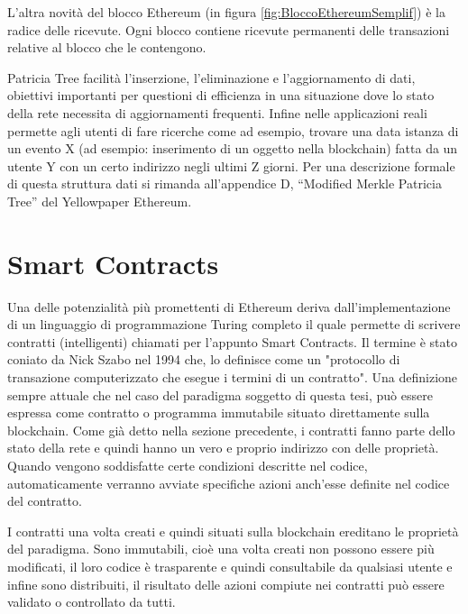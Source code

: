 L’altra novità del blocco Ethereum (in figura \ref{fig:BloccoEthereumSemplif}) è la radice delle ricevute. Ogni blocco contiene ricevute permanenti delle transazioni relative al blocco che le contengono.

Patricia Tree facilità l'inserzione, l'eliminazione e l'aggiornamento di dati, obiettivi importanti per questioni di efficienza in una situazione dove lo stato della rete necessita di aggiornamenti frequenti. Infine nelle applicazioni reali permette agli utenti di fare ricerche come ad esempio, trovare una data istanza di un evento X (ad esempio: inserimento di un oggetto nella blockchain) fatta da un utente Y con un certo indirizzo negli ultimi Z giorni.
Per una descrizione formale di questa struttura dati si rimanda all’appendice D, “Modified Merkle Patricia Tree” del Yellowpaper Ethereum.

\section{Smart Contracts}

Una delle potenzialità più promettenti di Ethereum deriva dall’implementazione di un linguaggio di programmazione Turing completo il quale permette di scrivere contratti (intelligenti) chiamati per l’appunto Smart Contracts. Il termine è stato coniato da Nick Szabo nel 1994 che, lo definisce come un "protocollo di transazione computerizzato che esegue i termini di un contratto". Una definizione sempre attuale che nel caso del paradigma soggetto di questa tesi, può essere espressa come contratto o programma immutabile situato direttamente sulla blockchain. Come già detto nella sezione precedente, i contratti fanno parte dello stato della rete e quindi hanno un vero e proprio indirizzo con delle proprietà. Quando vengono soddisfatte certe condizioni descritte nel codice, automaticamente verranno avviate specifiche azioni anch'esse definite nel codice del contratto.

I contratti una volta creati e quindi situati sulla blockchain ereditano le proprietà del paradigma. Sono immutabili, cioè una volta creati non possono essere più modificati, il loro codice è trasparente e quindi consultabile da qualsiasi utente e infine sono distribuiti, il risultato delle azioni compiute nei contratti può essere validato o controllato da tutti.

